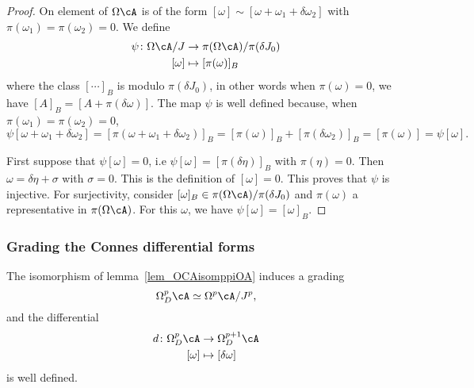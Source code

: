 \begin{proof}
	On element of $\Omega\cA$ is of the form $[\omega]\sim [\omega+\omega_1+\delta\omega_2]$ with $\pi(\omega_1)=\pi(\omega_2)=0$. We define
	\begin{equation}
		\begin{aligned}
			\psi\colon \Omega\cA/J & \to \pi(\Omega\cA)/\pi(\delta J_0) \\
			[\omega]               & \mapsto [\pi(\omega)]_B
		\end{aligned}
	\end{equation}
	where the class $[\cdots]_B$ is modulo $\pi(\delta J_0)$, in other words when $\pi(\omega)=0$, we have $[A]_B=[A+\pi(\delta\omega)]$.  The map $\psi$ is well defined because, when $\pi(\omega_1)=\pi(\omega_2)=0$,
	\[
		\psi[\omega+\omega_1+\delta\omega_2]=[\pi(\omega+\omega_1+\delta\omega_2)]_B
		=[\pi(\omega)]_B+[\pi(\delta\omega_2)]_B
		=[\pi(\omega)]
		=\psi[\omega].
	\]

	First suppose that $\psi[\omega]=0$, i.e $\psi[\omega]=[\pi(\delta\eta)]_B$ with $\pi(\eta)=0$. Then $\omega=\delta\eta+\sigma$ with $\sigma=0$. This is the definition of $[\omega]=0$. This proves that $\psi$ is injective. For surjectivity, consider $[\omega]_B\in\pi(\Omega\cA)/\pi(\delta J_0)$ and $\pi(\omega)$ a representative in $\pi(\Omega\cA)$. For this $\omega$, we have $\psi[\omega]=[\omega]_B$.
\end{proof}

\subsubsection{Grading the Connes differential forms}

\begin{lemma}			\label{LemOmpmdDp}
	The isomorphism of lemma~\ref{lem_OCAisomppiOA} induces a grading
	\begin{equation} \label{eq_OpDAsimeqOpA}
		\Omega^p_D\cA\simeq \Omega^p\cA/J^p,
	\end{equation}
	and the differential
	\begin{equation}
		\begin{aligned}
			d\colon \Omega^p_D\cA & \to \Omega^{p+1}_D\cA  \\
			[\omega]              & \mapsto [\delta\omega]
		\end{aligned}
	\end{equation}
	is well defined.
	\label{lem_isomgraODA}
\end{lemma}

